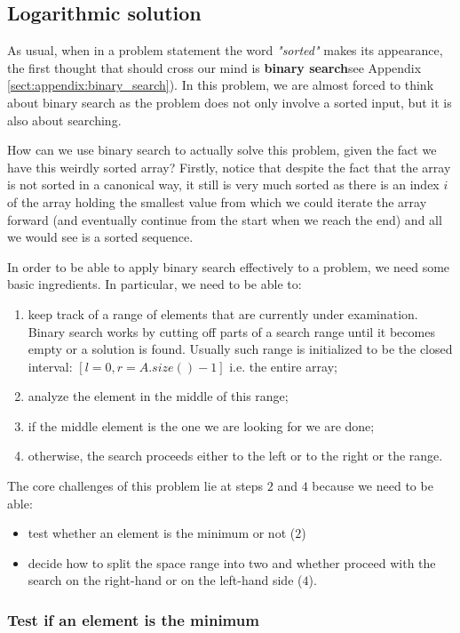 \subsection{Logarithmic solution}
\label{min_rotated_array:sec:log}
As usual, when in a problem statement the word \textit{"sorted"} makes its appearance, the first thought that should cross our mind is \textbf{binary search}see Appendix \ref{sect:appendix:binary_search}). In this problem, we are almost forced to think about binary search as the problem does not only involve a sorted input, but it is also about searching. 

How can we use binary search to actually solve this problem, given the fact we have this weirdly sorted array? 
Firstly, notice that despite the fact that the array is not sorted in a canonical way, it still is very much sorted as there is an index $i$ of the array holding the smallest value from which we could iterate the array forward (and eventually continue from the start when we reach the end) and all we would see is a sorted sequence.

In order to be able to apply binary search effectively to a problem, we need some basic ingredients. In particular, we need to be able to:
\begin{enumerate}
	\item keep track of a range of elements that are currently under examination. Binary search works by cutting off parts of a search range until it becomes empty or a solution is found.  Usually such range is initialized to be the closed interval: $[l=0, r=A.size()-1]$ i.e. the entire array;
	\item analyze the element in the middle of this range;
	\item if the middle element is the one we are looking for we are done;
	\item otherwise, the search proceeds either to the left or to the right or the range. 
\end{enumerate}

The core challenges of this problem lie at steps $2$ and $4$ because we need to be able:
\begin{itemize}
	\item test whether an element is the minimum or not ($2$)
	\item decide how to split the space range into two and whether proceed with the search on the right-hand or on the left-hand side ($4$).
\end{itemize}

\subsubsection{Test if an element is the minimum}

